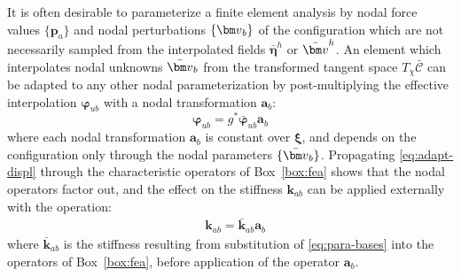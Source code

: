 It is often desirable to parameterize a finite element analysis by nodal
force values \(\{\bm{p}_a\}\) and nodal perturbations
\(\{\VarConfig_b\}\) of the configuration  
which are not necessarily sampled from the interpolated fields
\(\bar{\bm{\eta}}^h\) or \(\bar{\VarConfig}^h\). An element which
interpolates nodal unknowns
\(\bar{\VarConfig}_b\) from the transformed tangent space \(T_\chi \bar{\mathscr{C}}\) can be adapted to any
other nodal parameterization by post-multiplying the effective
interpolation \(\bm{\varphi}^{}_{u b}\) with a nodal transformation
\(\mathbf{a}_b\): 
\begin{equation}
{\bm{\varphi}}_{u b} = g^*\bar{\bm{\varphi}}_{u b} \mathbf{a}_b
\label{eq:adapt-displ}
\end{equation} 
where each nodal transformation
\(\mathbf{a}_b\) is constant over \(\bm{\xi}\), and depends on the
configuration only through the nodal parameters \(\{\bar{\VarConfig}_b\}\).
Propagating \eqref{eq:adapt-displ} through the characteristic operators
of Box~\ref{box:fea} shows that the nodal operators factor out, and the effect on
the stiffness \({\mathbf{k}}_{a b}\) can be applied externally with the operation:
\begin{equation}
\begin{aligned}
&\mathbf{k}_{ab} = \bar{\mathbf{k}}_{ab} \mathbf{a}_{b}
\end{aligned}
\label{eq:adapt-petr-para}
\end{equation}
where $\bar{\mathbf{k}}_{ab}$ is the stiffness resulting from substitution of \eqref{eq:para-bases} into the operators of Box~\ref{box:fea},
before application of the operator \(\mathbf{a}_b\).

